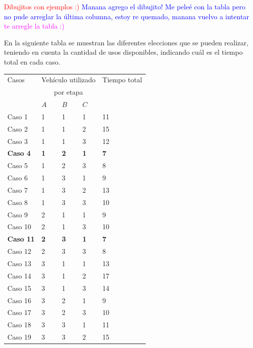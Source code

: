 \textcolor{red}{Dibujitos con ejemplos :)} \textcolor{blue}{Manana agrego el dibujito! Me peleé con la tabla pero no pude arreglar la última columna, estoy re quemado, manana vuelvo a intentar} \textcolor{magenta}{te arregle la tabla :)}\\

\newpage

En la siguiente tabla se muestran las diferentes elecciones que se pueden realizar,
teniendo en cuenta la cantidad de usos disponibles, indicando cu\'al es el tiempo total en cada caso.\\

\begin{table}[htb]
\centering
\begin{tabular}[c]{|l|l|l|l|l|}

		\hline
		Casos &\multicolumn{3}{|c|}{Veh\'iculo utilizado}& Tiempo total \\
		&\multicolumn{3}{|c|}{por etapa}&   \\
		\cline{2-4}
		&  $A$  &  $B$  &  $C$ &  \\
		\hline
		Caso 1& 1 & 1 & 1 & 11 \\
		\hline
		Caso 2& 1 & 1 & 2 & 15 \\
		\hline
		Caso 3& 1 & 1 & 3 & 12 \\
		\hline
		\textbf{Caso 4}& \textbf{1} & \textbf{2} & \textbf{1} & \textbf{7} \\
		\hline
		Caso 5& 1 & 2 & 3 & 8 \\
		\hline		
		Caso 6& 1 & 3 & 1 & 9 \\
		\hline
		Caso 7& 1 & 3 & 2 & 13 \\
		\hline
		Caso 8& 1 & 3 & 3 & 10 \\
		\hline
		Caso 9& 2 & 1 & 1 & 9\\
		\hline
		Caso 10& 2 & 1 & 3 & 10 \\
		\hline
		\textbf{Caso 11}& \textbf{2} & \textbf{3} & \textbf{1} & \textbf{7} \\
		\hline
		Caso 12& 2 & 3 & 3 & 8 \\
		\hline
		Caso 13& 3 & 1 & 1 & 13 \\
		\hline
		Caso 14& 3 & 1 & 2 & 17 \\
		\hline
		Caso 15& 3 & 1 & 3 & 14 \\
		\hline
		Caso 16& 3 & 2 & 1 & 9 \\
		\hline
		Caso 17& 3 & 2 & 3 & 10 \\
		\hline
		Caso 18& 3 & 3 & 1 & 11 \\
		\hline
		Caso 19& 3 & 3 & 2 & 15 \\
		\hline
		
	\end{tabular}
\end{table}\\

